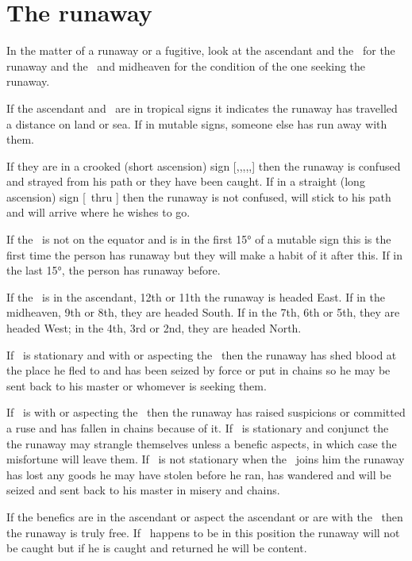 \section{The runaway}
In the matter of a runaway or a fugitive, look at the ascendant and the \Moon\, for the runaway and the \Sun\, and midheaven for the condition of the one seeking the runaway.

If the ascendant and \Moon\, are in tropical signs it indicates the runaway has travelled a distance on land or sea. If in mutable signs, someone else has run away with them. 

If they are in a crooked (short ascension) sign [\Aries,\Taurus,\Gemini,\Capricorn,\Aquarius,\Pisces] then the runaway is confused and strayed from his path or they have been caught. If in a straight (long ascension) sign [\Cancer\, thru \Sagittarius] then the runaway is not confused, will stick to his path and will arrive where he wishes to go. 

If the \Moon\, is not on the equator and is in the first 15° of a mutable sign this is the first time the person has runaway but they will make a habit of it after this. If in the last 15°, the person has runaway before.

If the \Moon\, is in the ascendant, 12th or 11th the runaway is headed East. If in the midheaven,  9th or 8th, they are headed South. If in the 7th, 6th or 5th, they are headed West; in the 4th, 3rd or 2nd, they are headed North.

If \Mars\, is stationary and with or aspecting the \Moon\, then the runaway has shed blood at the place he fled to and has been seized by force or put in chains so he may be sent back to his master or whomever is seeking them.

If \Saturn\, is with or aspecting the \Moon\, then the runaway has raised suspicions or committed a ruse and has fallen in chains because of it. If \Saturn\, is stationary and conjunct the \Moon\, the runaway may strangle themselves unless a benefic aspects, in which case the misfortune will leave them. If \Saturn\, is not stationary when the \Moon\, joins him the runaway has lost any goods he may have stolen before he ran, has wandered and will be seized and sent back to his master in misery and chains.

If the benefics are in the ascendant or aspect the ascendant or are with the \Moon\, then the runaway is truly free. If \Venus\, happens to be in this position the runaway will not be caught but if he is caught and returned he will be content.




